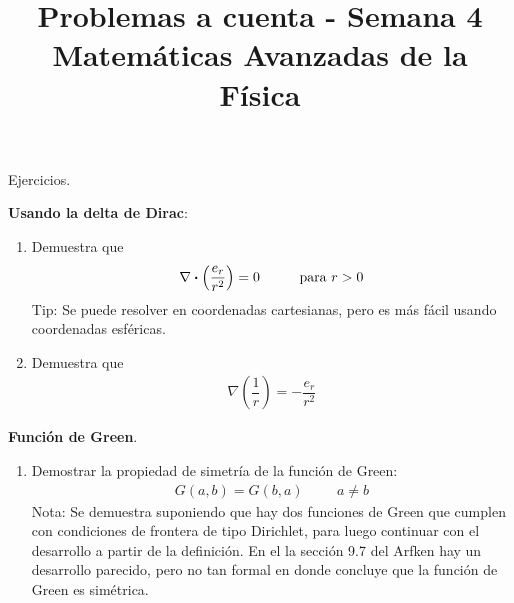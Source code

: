 \documentclass[12pt]{article}
\title{Problemas a cuenta - Semana 4 \\ {\large Matemáticas Avanzadas de la Física}\vspace{-3ex}}
\date{ }
\author{}
\begin{document}
\renewcommand\labelenumii{\theenumi.{\arabic{enumii}}}
\maketitle
\fontsize{14}{14}\selectfont
Ejercicios.
\par
\textbf{Usando la delta de Dirac}:
\begin{enumerate}
\item Demuestra que 
\begin{align*}
\nabla \vdot \left( \dfrac{e_{r}}{r^{2}} \right) = 0 \hspace{1cm} \mbox{para } r > 0
\end{align*}
Tip: Se puede resolver en coordenadas cartesianas, pero es más fácil usando coordenadas esféricas.
\item Demuestra que 
\begin{align*}
\nabla \left( \dfrac{1}{r} \right) = - \dfrac{e_{r}}{r^{2}}
\end{align*}
\end{enumerate}
\par
\textbf{Función de Green}.
\begin{enumerate}[resume]
\item Demostrar la propiedad de simetría de la función de Green:
\begin{align*}
G(a, b) =  G(b, a) \hspace{1cm} a \neq b
\end{align*}
Nota: Se demuestra suponiendo que hay dos funciones de Green que cumplen con condiciones de frontera de tipo Dirichlet, para luego continuar con el desarrollo a partir de la definición. En el la sección 9.7 del Arfken hay un desarrollo parecido, pero no tan formal en donde concluye que la función de Green es simétrica.
\end{enumerate}
\end{document}
